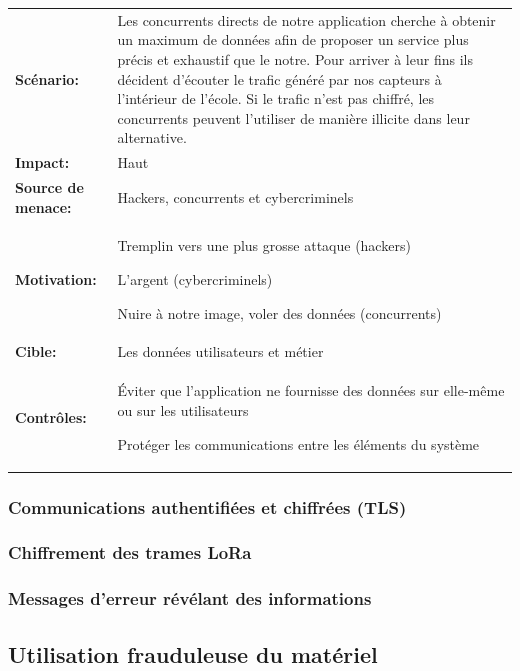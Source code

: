 \documentclass[12pt]{article}
\begin{document}
\renewcommand{\arraystretch}{1.6}
\begin{tabular}{@{}p{4cm}p{12cm}}
\textbf{Scénario:} &  Les concurrents directs de notre application cherche à obtenir un maximum de données afin de proposer un service plus précis et exhaustif que le notre. Pour arriver à leur fins ils décident d'écouter le trafic généré par nos capteurs à l'intérieur de l'école. Si le trafic n'est pas chiffré, les concurrents peuvent l'utiliser de manière illicite dans leur alternative.\\
\textbf{Impact:} & Haut \\
\textbf{Source de menace: } & Hackers, concurrents et cybercriminels \\
\textbf{Motivation:} & Tremplin vers une plus grosse attaque (hackers)

L'argent (cybercriminels)

Nuire à notre image, voler des données (concurrents)\\
\textbf{Cible:} & Les données utilisateurs et métier \\
\textbf{Contrôles:} & Éviter que l'application ne fournisse des données sur elle-même ou sur les utilisateurs

Protéger les communications entre les éléments du système
\end{tabular}
\renewcommand{\arraystretch}{1}

\subsubsection{Communications authentifiées et chiffrées (TLS)}

\subsubsection{Chiffrement des trames LoRa}

\subsubsection{Messages d'erreur révélant des informations}


\subsection{Utilisation frauduleuse du matériel}
\end{document}
